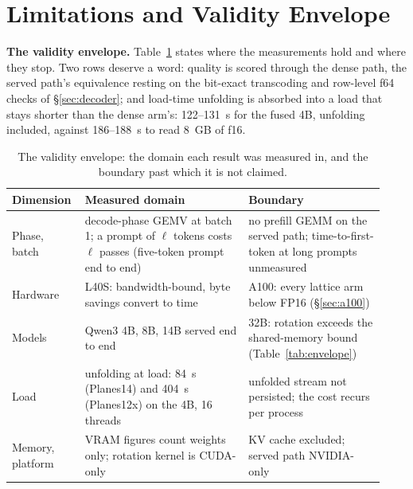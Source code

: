 \section{Limitations and Validity Envelope}
\label{sec:limitations}

\textbf{The validity envelope.} Table~\ref{tab:validity} states where the
measurements hold and where they stop. Two rows deserve a word: quality is
scored through the dense path, the served path's equivalence resting on the
bit-exact transcoding and row-level f64 checks of \S\ref{sec:decoder}; and
load-time unfolding is absorbed into a load that stays shorter than the
dense arm's: 122--131~s for the fused 4B, unfolding included, against
186--188~s to read 8~GB of f16.

\begin{table}[t]
\centering
\scriptsize
\setlength{\tabcolsep}{4pt}
\begin{tabular}{>{\raggedright\arraybackslash}p{0.16\linewidth}>{\raggedright\arraybackslash}p{0.42\linewidth}>{\raggedright\arraybackslash}p{0.35\linewidth}}
\toprule
Dimension & Measured domain & Boundary \\
\midrule
Phase, batch & decode-phase GEMV at batch 1; a prompt of $\ell$ tokens costs $\ell$ passes (five-token prompt end to end) & no prefill GEMM on the served path; time-to-first-token at long prompts unmeasured \\
Hardware & L40S: bandwidth-bound, byte savings convert to time & A100: every lattice arm below FP16 (\S\ref{sec:a100}) \\
Models & Qwen3 4B, 8B, 14B served end to end & 32B: rotation exceeds the shared-memory bound (Table~\ref{tab:envelope}) \\
Load & unfolding at load: 84~s (Planes14) and 404~s (Planes12x) on the 4B, 16 threads & unfolded stream not persisted; the cost recurs per process \\
Memory, platform & VRAM figures count weights only; rotation kernel is CUDA-only & KV cache excluded; served path NVIDIA-only \\
\bottomrule
\end{tabular}
\caption{The validity envelope: the domain each result was measured in, and
the boundary past which it is not claimed.}
\label{tab:validity}
\end{table}

